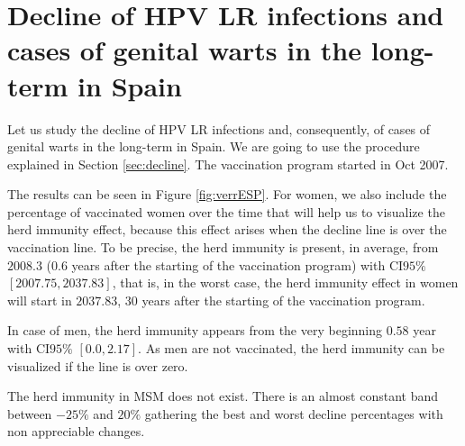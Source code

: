 \section{Decline of HPV LR infections and cases of genital warts in the long-term in Spain}\label{sec:verr_spain}
Let us study the decline of HPV LR infections and, consequently, of cases of genital warts in the long-term in Spain. We are going to use the procedure explained in Section \ref{sec:decline}. The vaccination program started in Oct 2007.

The results can be seen in Figure \ref{fig:verrESP}. For women, we also include the percentage of vaccinated women over the time that will help us to visualize the herd immunity effect, because this effect arises when the decline line is over the vaccination line. To be precise, the herd immunity is present, in average, from $2008.3$ ($0.6$ years after the starting of the vaccination program) with CI$95\%$ $[2007.75, 2037.83]$, that is, in the worst case, the herd immunity effect in women will start in $2037.83$, $30$ years after the starting of the vaccination program. 

In case of men, the herd immunity appears from the very beginning $0.58$ year with CI$95\%$ $[0.0, 2.17]$. As men are not vaccinated, the herd immunity can be visualized if the line is over zero. 

The herd immunity in MSM does not exist. There is an almost constant band between $-25\%$ and $20\%$ gathering the best and worst decline percentages with non appreciable changes.

